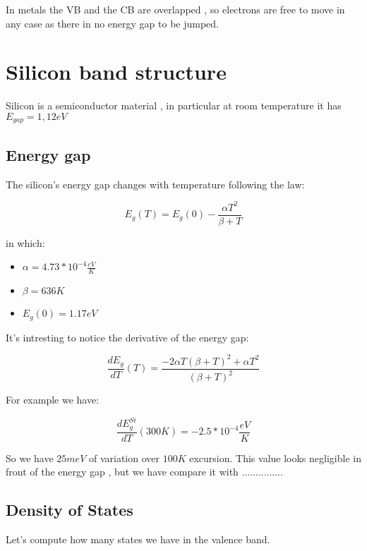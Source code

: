 		In metals the VB and the CB are overlapped , so electrons are free to move in any case as there in no energy gap to be jumped.

	\section{Silicon band structure}
	
		Silicon is a semiconductor material , in particular at room temperature it has $E_{gap}=1,12eV$

		\subsection{Energy gap}

			The silicon's energy gap changes with temperature following the law:

			\begin{equation}
				E_g(T)=E_g(0)-\frac{\alpha T^2}{\beta + T}
			\end{equation}
		
			in which:
		
			\begin{itemize}
				\item $\alpha = 4.73*10^{-4}\frac{eV}{K}$
				\item $\beta = 636K$
				\item $E_g(0)=1.17eV$
			\end{itemize}

			It's intresting to notice the derivative of the energy gap:

			\begin{equation}
				\frac{dE_g}{dT}(T)=\frac{-2\alpha T (\beta + T)^2 + \alpha T^2}{(\beta + T)^2}
			\end{equation}

			For example we have:


			\begin{equation}
				\frac{dE_g^{Si}}{dT}(300K)=-2.5*10^{-4}\frac{eV}{K}
			\end{equation}

			So we have $25meV$ of variation over $100K$ excursion.
			This value looks negligible in front of the energy gap , but we have compare it with ...............

		\subsection{Density of States}

			Let's compute how many states we have in the valence band.

